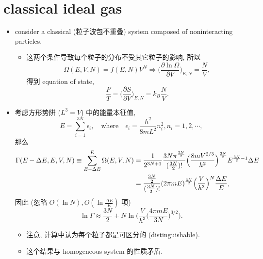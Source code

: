 \section{classical ideal gas} \label{1.2}
\begin{itemize}
	\item consider a classical (粒子波包不重叠) system composed of noninteracting particles.
	\begin{itemize}
		\item 这两个条件导致每个粒子的分布不受其它粒子的影响, 所以
		\begin{equation}
			\Omega(E, V, N) = f(E, N) V^N \Longrightarrow \Big( \frac{\partial \ln \Omega}{\partial V} \Big)_{E, N} = \frac{N}{V},
		\end{equation}
		得到 equation of state,
		\begin{equation}
			\frac{P}{T} = \Big( \frac{\partial S}{\partial V} \Big)_{E, N} = k_B \frac{N}{V}.
		\end{equation}
	\end{itemize}
	
	\item 考虑方形势阱 ($L^3 = V$) 中的能量本征值,
	\begin{equation} \label{1.2.3}
		E = \sum_{i = 1}^{3 N} \epsilon_i, \quad \text{where} \quad \epsilon_i = \frac{h^2}{8 m L^2} n_i^2, n_i = 1, 2, \cdots,
	\end{equation}
	那么
	\begin{align}
		\Gamma(E - \Delta E, E,  V, N) \equiv \sum_{E - \Delta E}^E \Omega(E, V, N) &= \frac{1}{2^{3 N + 1}} \frac{3 N \pi^{\frac{3 N}{2}}}{(\frac{3 N}{2})!} \Big( \frac{8 m V^{2 / 3}}{h^2} \Big)^{\frac{3 N}{2}} E^{\frac{3 N}{2} - 1} \Delta E \notag \\
		&= \frac{\frac{3 N}{2}}{(\frac{3 N}{2})!} (2 \pi m E)^{\frac{3 N}{2}} \Big( \frac{V}{h^3} \Big)^N \frac{\Delta E}{E},
	\end{align}
	因此 (忽略 $O(\ln N), O(\ln \frac{\Delta E}{E})$ 项)
	\begin{equation} \label{1.2.5}
		\ln \Gamma \approx \frac{3 N}{2} + N \ln \Big( \frac{V}{h^3} \Big( \frac{4 \pi m E}{3 N} \Big)^{3 / 2} \Big).
	\end{equation}
	\begin{itemize}
		\item 注意, 计算中认为每个粒子都是可区分的 (distinguishable).
		
		\item 这个结果与 homogeneous system 的性质矛盾.
	\end{itemize}
	

\end{itemize}
